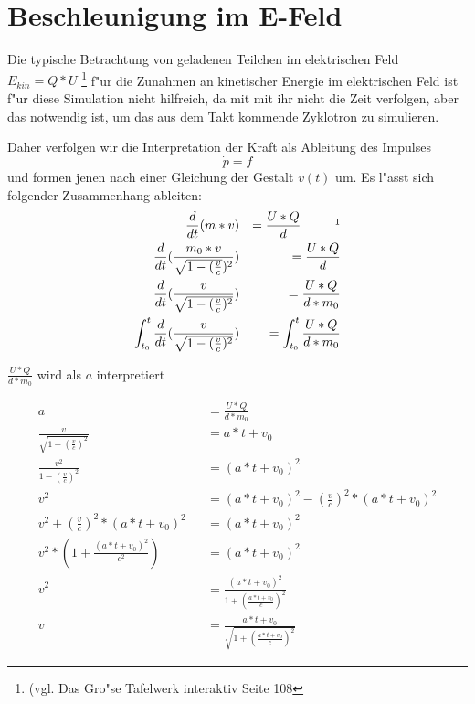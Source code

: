 \documentclass[14pt, a4paper]{report}
\begin{document}
\section{Beschleunigung im E-Feld}
Die typische Betrachtung von geladenen Teilchen im elektrischen Feld 
$E_{kin} = Q * U$ \footnote{(vgl. Das Gro"se Tafelwerk interaktiv Seite 108}
f"ur die Zunahmen an kinetischer Energie im elektrischen Feld ist f"ur diese Simulation
nicht hilfreich, da mit mit ihr nicht die Zeit verfolgen, aber das notwendig ist, um das
aus dem Takt kommende Zyklotron zu simulieren. 

Daher verfolgen wir die Interpretation der Kraft als Ableitung des Impulses
\begin{equation}
\dot{p} = f 
\end{equation}
und formen jenen nach einer Gleichung der Gestalt $v(t)$ um.
\newpage
Es l"asst sich folgender Zusammenhang ableiten:
\begin{eqnarray}
\frac{d}{dt} (m * v ) && = \frac{U * Q}{d} ~~~~~~~~\footnotemark \\
\frac{d}{dt} (\frac{m_0 * v}{\sqrt{1 - (\frac{v}{c}})^2}) && = \frac{U * Q}{d} \\
\frac{d}{dt} (\frac{v}{\sqrt{1 - (\frac{v}{c})^2}}) && = \frac{U * Q}{d * m_0} \\
\int_{t_0}^t \frac{d}{dt} (\frac{v}{\sqrt{1 - (\frac{v}{c})^2}}) 
    && = \int_{t_0}^t \frac{U * Q}{d * m_0} \\
\end{eqnarray}
\begin{center}
$ \frac{U * Q}{d * m_0} $ wird als $ a $ interpretiert
\end{center}
\begin{eqnarray}
a && = \frac{U * Q}{d * m_0} \label{Beschleunigung} \\ 
\frac{v}{\sqrt{1 - (\frac{v}{c})^2}} && = a * t + v_0 \\
\frac{v^2}{1 - (\frac{v}{c})^2} && = (a * t + v_0 )^2 \\
v^2  && = (a * t + v_0)^2 - (\frac{v}{c})^2 * (a * t + v_0)^2\\
v^2 + (\frac{v}{c})^2 * (a * t + v_0)^2 && = (a * t + v_0)^2 \\
v^2 * (1 + \frac{(a * t + v_0)^2}{c^2}) &&  = (a * t + v_0)^2 \\
v^2 && = \frac{(a * t + v_0)^2}{1 + (\frac{a * t + v_0}{c})^2} \\ 
v && = \frac{a * t + v_0}{\sqrt{1 + (\frac{a * t + v_0}{c})^2}}
\end{eqnarray}
\end{document}
